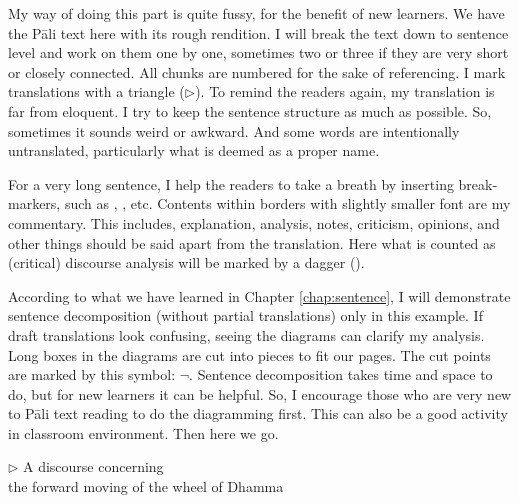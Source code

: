 My way of doing this part is quite fussy, for the benefit of new learners. We have the P\=ali text here with its rough rendition. I will break the text down to sentence level and work on them one by one, sometimes two or three if they are very short or closely connected. All chunks are numbered for the sake of referencing. I mark translations with a triangle ($\triangleright$). To remind the readers again, my translation is far from eloquent. I try to keep the sentence structure as much as possible. So, sometimes it sounds weird or awkward. And some words are intentionally untranslated, particularly what is deemed as a proper name.

For a very long sentence, I help the readers to take a breath by inserting break-markers, such as , , etc. Contents within borders with slightly smaller font are my commentary. This includes, explanation, analysis, notes, criticism, opinions, and other things should be said apart from the translation. Here what is counted as (critical) discourse analysis will be marked by a dagger (\dag).

According to what we have learned in Chapter \ref{chap:sentence}, I will demonstrate sentence decomposition (without partial translations) only in this example. If draft translations look confusing, seeing the diagrams can clarify my analysis. Long boxes in the diagrams are cut into pieces to fit our pages. The cut points are marked by this symbol: $\neg$. Sentence decomposition takes time and space to do, but for new learners it can be helpful. So, I encourage those who are very new to P\=ali text reading to do the diagramming first. This can also be a good activity in classroom environment. Then here we go.

\bigskip
\begin{center}
\textbf{}\par
$\triangleright$ A discourse concerning\\the forward moving of the wheel of Dhamma 
\end{center}

